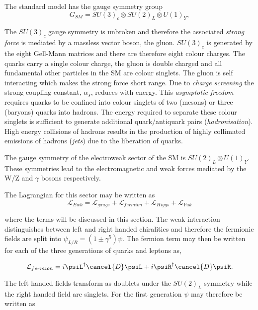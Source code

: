 The standard model has the gauge symmetry group
\begin{equation}
G_{SM} = SU(3)_{c}\otimes SU(2)_{L}\otimes U(1)_{Y},
\end{equation}

The $SU(3)_c$ gauge symmetry is unbroken and therefore the associated
\emph{strong force} is mediated by a massless vector boson, the gluon.
$SU(3)_c$ is generated by the eight Gell-Mann matrices and there are therefore eight colour charges. 
The quarks carry a single colour charge, the gluon is double charged and all fundamental 
other particles in the SM are colour singlets. The gluon is self interacting which makes
the strong force short range. Due to \emph{charge screening} the strong coupling constant, $\alpha_s$, 
reduces with energy. This \emph{asymptotic freedom} requires quarks to be confined into colour singlets
of two (mesons) or three (baryons) quarks into hadrons. The energy required to separate these colour singlets 
is sufficient to generate additional quark/antiquark pairs (\emph{hadronisation}). High
energy collisions of hadrons results in the production of highly 
collimated emissions of hadrons (\emph{jets}) due to the liberation of quarks.

The gauge symmetry of the electroweak sector of the SM is $SU(2)_L\otimes U(1)_Y$. These symmetries lead
to the electromagnetic and weak forces mediated by the W/Z and $\gamma$ bosons respectively.

The Lagrangian for this sector may be written as 
\begin{equation}
\mathcal{L}_{Ewk} = \mathcal{L}_{gauge} + \mathcal{L}_{fermion} + \mathcal{L}_{Higgs} + \mathcal{L}_{Yuk}
\end{equation}

where the terms will be discussed in this section. The weak interaction distinguishes
between left and right handed chiralities and therefore the fermionic fields are split into
$\psi_{L/R} = (1\pm\gamma^5)\psi$. The fermion term may then be written for each of the 
three generations of quarks and leptons as,

\begin{equation}
\mathcal{L}_{fermion} = i \psiL^{\dagger}\cancel{D}\psiL + i \psiR^{\dagger}\cancel{D}\psiR.
\end{equation}

The left handed fields transform as doublets under the $SU(2)_L$ symmetry
while the right handed field are singlets.
For the first generation $\psi$ may therefore be written as

